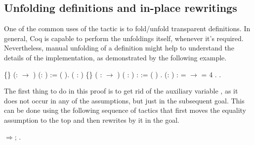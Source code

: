 \subsection{Unfolding definitions and in-place rewritings}


\label{sec:in-place}


One of the common uses of the  tactic is to fold/unfold
transparent definitions. In general, Coq is capable to perform the
unfoldings itself, whenever it's required. Nevertheless, manual
unfolding of a definition might help to understand the details of the
implementation, as demonstrated by the following example.


\begin{coqdoccode}
\coqdocemptyline
\coqdocnoindent
{}  \{\} (:  \ensuremath{\rightarrow} ) (: ) :=  ( ).\coqdoceol
\coqdocemptyline
\coqdocnoindent
{}  ( : ) \{\} ( :  \ensuremath{\rightarrow} ) ( : ) :  :=\coqdoceol
\coqdocindent{1.00em}
       (   )  .\coqdoceol
\coqdocemptyline
\coqdocnoindent
{}   (: )  : \coqdoceol
\coqdocindent{1.00em}
 =    \ensuremath{\rightarrow}    =  4  .\coqdoceol
\coqdocnoindent
{}.\coqdoceol
\coqdocemptyline
\end{coqdoccode}


The first thing to do in this proof is to get rid of the auxiliary
variable , as it does not occur in any of the assumptions, but just
in the subsequent goal. This can be done using the following sequence
of tactics that first moves the equality assumption to the top and
then rewrites by it in the goal.


\begin{coqdoccode}
\coqdocemptyline
\coqdocnoindent
{}\ensuremath{\Rightarrow};  .\coqdoceol
\coqdocemptyline
\end{coqdoccode}


